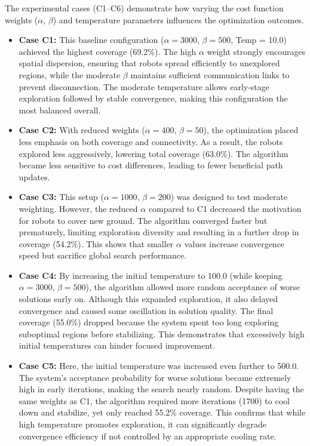 The experimental cases (C1–C6) demonstrate how varying the cost function weights ($\alpha$, $\beta$) and temperature parameters influences the optimization outcomes.
\begin{itemize}
    \item \textbf{Case C1:} 
    This baseline configuration ($\alpha=3000$, $\beta=500$, Temp = 10.0) achieved the highest coverage (69.2\%). 
    The high $\alpha$ weight strongly encourages spatial dispersion, ensuring that robots spread efficiently to unexplored regions, while the moderate $\beta$ maintains sufficient communication links to prevent disconnection. 
    The moderate temperature allows early-stage exploration followed by stable convergence, making this configuration the most balanced overall.

    \item \textbf{Case C2:} 
    With reduced weights ($\alpha=400$, $\beta=50$), the optimization placed less emphasis on both coverage and connectivity. 
    As a result, the robots explored less aggressively, lowering total coverage (63.0\%). 
    The algorithm became less sensitive to cost differences, leading to fewer beneficial path updates.

    \item \textbf{Case C3:} 
    This setup ($\alpha=1000$, $\beta=200$) was designed to test moderate weighting. 
    However, the reduced $\alpha$ compared to C1 decreased the motivation for robots to cover new ground. 
    The algorithm converged faster but prematurely, limiting exploration diversity and resulting in a further drop in coverage (54.2\%). 
    This shows that smaller $\alpha$ values increase convergence speed but sacrifice global search performance.

    \item \textbf{Case C4:} 
    By increasing the initial temperature to 100.0 (while keeping $\alpha=3000$, $\beta=500$), the algorithm allowed more random acceptance of worse solutions early on. 
    Although this expanded exploration, it also delayed convergence and caused some oscillation in solution quality. 
    The final coverage (55.0\%) dropped because the system spent too long exploring suboptimal regions before stabilizing. 
    This demonstrates that excessively high initial temperatures can hinder focused improvement.

    \item \textbf{Case C5:} 
    Here, the initial temperature was increased even further to 500.0. 
    The system’s acceptance probability for worse solutions became extremely high in early iterations, making the search nearly random. 
    Despite having the same weights as C1, the algorithm required more iterations (1700) to cool down and stabilize, yet only reached 55.2\% coverage. 
    This confirms that while high temperature promotes exploration, it can significantly degrade convergence efficiency if not controlled by an appropriate cooling rate.


\end{itemize}
